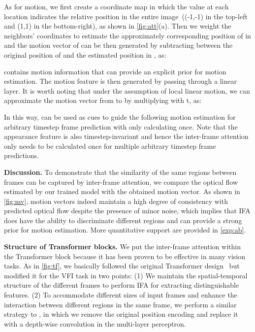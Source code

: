 \documentclass[10pt,twocolumn,letterpaper]{article}
\begin{document}
        As for motion, we first create a coordinate map  in which the value at each location indicates the relative position in the entire image~((-1,-1) in the top-left and (1,1) in the bottom-right), as shown in \cref{fig:att}(a). Then we weight the neighbors' coordinates to estimate the approximately corresponding position of  in  and the motion vector  of  can be then generated by subtracting between the original position of  and the estimated position in , as:
        
        
         contains motion information that can provide an explicit prior for motion estimation. The motion feature is then generated by passing  through a linear layer. It is worth noting that under the assumption of local linear motion, we can approximate the motion vector from  to  by multiplying  with t, as:
        
        
        In this way,  can be used as cues to guide the following motion estimation for arbitrary timestep frame prediction with only calculating  once. Note that the appearance feature  is also timestep-invariant and hence the inter-frame attention only needs to be calculated once for multiple arbitrary timestep frame predictions. 
        
        \noindent
        \textbf{Discussion.} To demonstrate that the similarity of the same regions between frames can be captured by inter-frame attention, we compare the optical flow estimated by our trained model with the obtained motion vector. As shown in \cref{fig:mv}, motion vectors indeed maintain a high degree of consistency with predicted optical flow despite the presence of minor noise, which implies that IFA does have the ability to discriminate different regions and  can provide a strong prior for motion estimation. More quantitative support are provided in \cref{exp:ab}.
        
        \noindent
        \textbf{Structure of Transformer blocks.} We put the inter-frame attention within the Transformer block because it 
          has been proven to be effective in many vision tasks. As in \cref{fig:tf}, we basically followed the original Transformer design~\cite{vaswani2017attention} but modified it for the VFI task in two points: (1) We maintain the spatial-temporal structure of the different frames to perform IFA for extracting distinguishable features. (2) To accommodate different sizes of input frames and enhance the interaction between different regions in the same frame, we perform a similar strategy to \cite{chu2021conditional, wang2022pvt}, in which we remove the original position encoding and replace it with a depth-wise convolution in the multi-layer perceptron.
\end{document}

